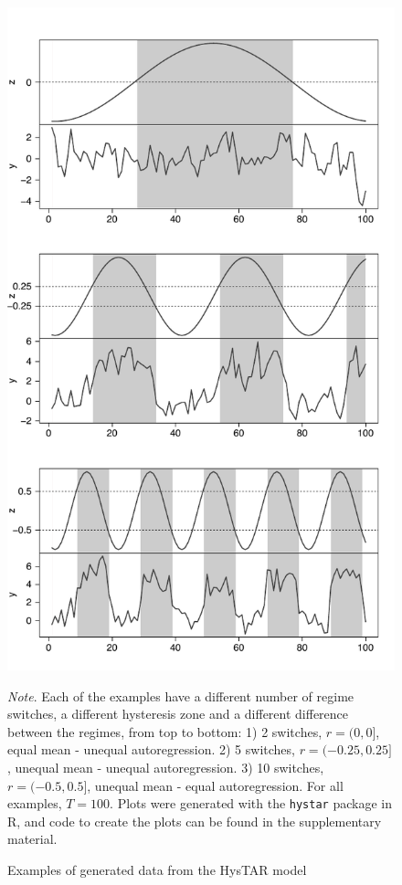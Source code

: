 \documentclass{article}
\begin{document}
\begin{figure} 
\caption{Examples of generated data from the HysTAR model}
\begin{center}
\includegraphics[scale=.6]{ts_examples}
\end{center}
\bigskip
\small\textit{Note}. Each of the examples have a different number of regime switches, a different hysteresis zone and a different difference between the regimes, from top to bottom: 1) 2 switches, $r = (0, 0]$, equal mean - unequal autoregression. 2) 5 switches, $r = (-0.25, 0.25]$, unequal mean - unequal autoregression. 3) 10 switches, $r = (-0.5, 0.5]$, unequal mean - equal autoregression. For all examples, $T = 100$. Plots were generated with the \texttt{hystar} package in \textsf{R}, and code to create the plots can be found in the supplementary material.
\label{fig:ts_examples}
\end{figure}
\end{document}
